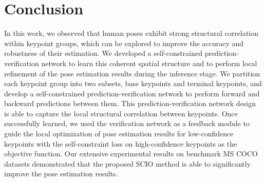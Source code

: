 \documentclass[runningheads]{llncs}
\begin{document}
\section{Conclusion}
In this work, we observed that  human poses exhibit strong structural correlation  within keypoint groups, which can be  explored to improve the accuracy and robustness of their estimation. 
We developed a self-constrained prediction-verification network to learn this coherent spatial structure and to perform local refinement of the pose estimation results during the inference stage. 
We partition each keypoint group into two subsets, base keypoints and terminal keypoints, and develop a self-constrained prediction-verification network  to perform forward and backward predictions between them. This prediction-verification network design is able  to capture the local structural correlation between keypoints. 
Once successfully learned, we used the verification network as a feedback module to guide the local optimization of pose estimation results for low-confidence keypoints with the self-constraint loss on high-confidence keypoints as the objective function. Our extensive experimental results on benchmark MS COCO datasets demonstrated that the proposed SCIO method is able to significantly improve the pose estimation results. 





\end{document}
